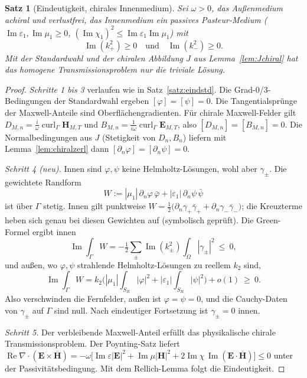 \documentclass[11pt, a4paper]{article}
\newcommand{\mvec}[1]{\boldsymbol{#1}}
\theoremstyle{plain}
\newtheorem{satz}{Satz}[section]
\theoremstyle{definition}
\newcommand{\status}[1]{\hfill{\small\sffamily[#1]}}
\begin{document}
\begin{satz}[Eindeutigkeit, chirales Innenmedium]\label{satz:eindchiral}\status{bewiesen, reguläre Lösungen}
Sei $\omega>0$, das Außenmedium achiral und verlustfrei, das Innenmedium ein passives
Pasteur-Medium ($\operatorname{Im}\varepsilon_1,\operatorname{Im}\mu_1\ge0$,
$(\operatorname{Im}\chi_1)^2\le\operatorname{Im}\varepsilon_1\operatorname{Im}\mu_1$) mit
\begin{equation}\label{eq:imkpm}
  \operatorname{Im}(k_+^2)\ge0\quad\text{und}\quad\operatorname{Im}(k_-^2)\ge0 .
\end{equation}
Mit der Standardwahl und der chiralen Abbildung $J$ aus Lemma~\ref{lem:Jchiral} hat das
homogene Transmissionsproblem nur die triviale Lösung.
\end{satz}
\begin{proof}
\emph{Schritte 1 bis 3} verlaufen wie in Satz~\ref{satz:eindstd}. Die
Grad-0/3-Bedingungen der Standardwahl ergeben $[\varphi]=[\psi]=0$. Die
Tangentialsprünge der Maxwell-Anteile sind Oberflächengradienten. Für chirale
Maxwell-Felder gilt $D_{M,n}=\frac{i}{\omega}\operatorname{curl}_\Gamma\mvec{H}_{M,T}$ und
$B_{M,n}=\frac{1}{i\omega}\operatorname{curl}_\Gamma\mvec{E}_{M,T}$, also
$[D_{M,n}]=[B_{M,n}]=0$. Die Normalbedingungen aus $J$ (Stetigkeit von $D_n, B_n$)
liefern mit Lemma~\ref{lem:chiralzerl} dann $[\partial_n\varphi]=[\partial_n\psi]=0$.

\emph{Schritt 4 (neu).} Innen sind $\varphi,\psi$ keine Helmholtz-Lösungen, wohl aber
$\gamma_\pm$. Die gewichtete Randform
\[
  W := |\mu_1|\,\partial_n\varphi\,\bar\varphi + |\varepsilon_1|\,\partial_n\psi\,\bar\psi
\]
ist über $\Gamma$ stetig. Innen gilt punktweise
$W=\tfrac12\big(\partial_n\gamma_+\bar\gamma_++\partial_n\gamma_-\bar\gamma_-\big)$; die
Kreuzterme heben sich genau bei diesen Gewichten auf (symbolisch geprüft). Die
Green-Formel ergibt innen
\[
  \operatorname{Im}\int_\Gamma W = -\tfrac12\sum_\pm\operatorname{Im}(k_\pm^2)\int_\Omega|\gamma_\pm|^2\ \le\ 0,
\]
und außen, wo $\varphi,\psi$ strahlende Helmholtz-Lösungen zu reellem $k_2$ sind,
\[
  \operatorname{Im}\int_\Gamma W = k_2\Big(|\mu_1|\int_{S_R}|\varphi|^2+|\varepsilon_1|\int_{S_R}|\psi|^2\Big)+o(1)\ \ge\ 0 .
\]
Also verschwinden die Fernfelder, außen ist $\varphi=\psi=0$, und die
Cauchy-Daten von $\gamma_\pm$ auf $\Gamma$ sind null. Nach eindeutiger Fortsetzung ist
$\gamma_\pm=0$ innen.

\emph{Schritt 5.} Der verbleibende Maxwell-Anteil erfüllt das physikalische
chirale Transmissionsproblem. Der Poynting-Satz liefert
$\operatorname{Re}\nabla\cdot(\mvec{E}\times\overline{\mvec{H}})
= -\omega\big[\operatorname{Im}\varepsilon|\mvec{E}|^2+\operatorname{Im}\mu|\mvec{H}|^2
+2\operatorname{Im}\chi\,\operatorname{Im}(\mvec{E}\cdot\overline{\mvec{H}})\big]\le0$
unter der Passivitätsbedingung. Mit dem Rellich-Lemma folgt die Eindeutigkeit.
\end{proof}
\end{document}
